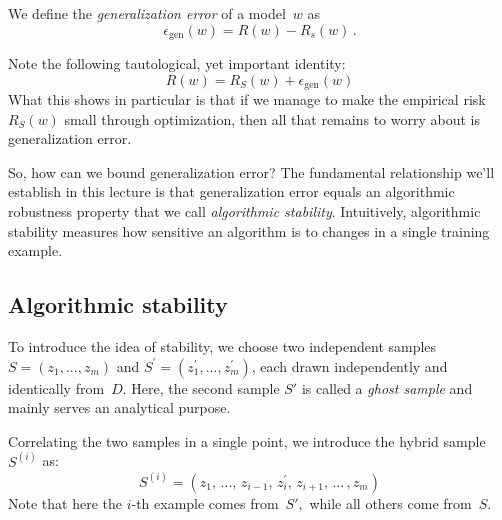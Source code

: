 \begin{definition}
We define the \emph{generalization error} of a model~$w$ as
$$\epsilon_{\text{gen}}(w) = R(w) - R_{s}(w)\,.$$
\end{definition}
Note the following tautological, yet important identity:
\begin{equation}
R(w) = R_{S}(w) + \epsilon_{\text{gen}}(w)
\end{equation} 
What this shows in particular is that if we manage to make the empirical risk
$R_S(w)$ small through optimization, then all that remains to worry about is
generalization error.

So, how can we bound generalization error? The fundamental relationship we'll
establish in this lecture is that generalization error equals an algorithmic
robustness property that we call \emph{algorithmic stability}. Intuitively,
algorithmic stability measures how sensitive an algorithm is to changes in a
single training example.

\subsection{Algorithmic stability}

To introduce the idea of stability, we choose two independent samples
$S = (z_1, ... , z_m)$ and $S^{\prime} = (z^{\prime}_1, ... ,z^{\prime}_{m})$,
each drawn independently and identically from~$D$. Here, the second sample $S'$
is called a \emph{ghost sample} and mainly serves an analytical purpose.

Correlating the two samples in a single point, we introduce the hybrid sample
$S^{(i)}$ as:
$$S^{(i)} = (z_1, \,... ,\, z_{i-1}, \,z_{i}^{\prime},\, z_{i+1}, \,... \,,z_{m})$$
Note that here the $i$-th example comes from~$S',$ while all others come
from~$S.$

